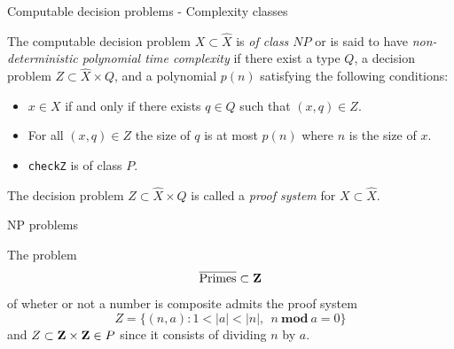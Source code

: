 %

\begin{frame}{Computable decision problems - Complexity classes}
	\begin{defn}
		The computable decision problem $X \subset \hat{X}$ is
		\emph{of class $NP$} or is said to have
		\emph{non-deterministic polynomial time complexity} if there exist
		a type $Q$, a decision problem $Z \subset \hat{X} \times Q$, and a
		polynomial $p(n)$ satisfying the following conditions:
		\begin{itemize}
			\item $x \in X$ if and only if there exists $q \in Q$ such that
				$(x, q) \in Z$.
			\item For all $(x, q) \in Z$ the size of $q$ is at most $p(n)$
				where $n$ is the size of $x$.
			\item \texttt{checkZ} is of class $P$.
		\end{itemize}

		The decision problem $Z \subset \hat{X} \times Q$ is called a
		\emph{proof system} for $X \subset \hat{X}$.
	\end{defn}
\end{frame}

%

\begin{frame}{NP problems}
	\begin{exl}
		The problem
		\[
			\overline{\text{Primes}} \subset \mathbf{Z}
		\]
		of wheter or not a number is composite admits the proof system
		\[
			Z= \{(n, a) : 1 < |a| < |n|,\ \ n \ 
				\mathbf{mod}\ a = 0\}
		\]
		and
		\(
			Z \subset \mathbf{Z} \times \mathbf{Z} \in P
		\)
		since it consists of dividing $n$ by $a$.
	\end{exl}
\end{frame}

